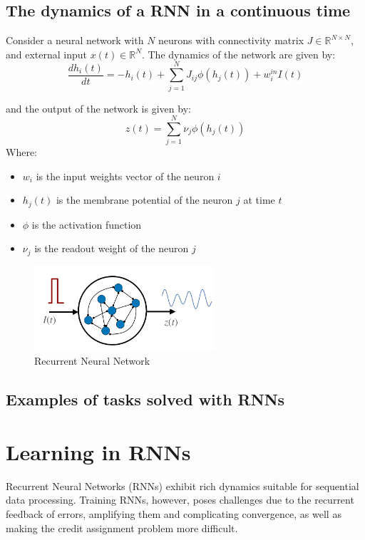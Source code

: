 \documentclass[11pt]{book} %
\begin{document}
\subsection{The dynamics of a RNN in a continuous time}
Consider a neural network with $N$ neurons with connectivity matrix $J \in \mathbb{R}^{N \times N}$, and external input $x(t) \in \mathbb{R}^N$.
The dynamics of the network are given by:
\[
    \frac{dh_i(t)}{dt} = -h_i(t) + \sum_{j=1}^N J_{ij} \phi(h_j(t)) + w_i^{in} I(t)
\]

and the output of the network is given by:
\[
    z(t) = \sum_{j=1}^N \nu_j \phi(h_j(t))
\]
Where:
\begin{itemize}
    \item $w_i$ is the input weights vector of the neuron $i$
    \item $h_j(t)$ is the membrane potential of the neuron $j$ at time $t$
    \item $\phi$ is the activation function
    \item $\nu_j$ is the readout weight of the neuron $j$
\end{itemize}

\begin{figure}
    \centering
    \includegraphics[width=0.6\textwidth]{Figs/RNN.jpeg}
    \caption{Recurrent Neural Network}
    \label{fig:rnn}
\end{figure}

\subsection{Examples of tasks solved with RNNs}

\section{Learning in RNNs}

Recurrent Neural Networks (RNNs) exhibit rich dynamics suitable for sequential data processing. 
Training RNNs, however, poses challenges due to the recurrent feedback of errors, amplifying them and complicating convergence, 
as well as making the credit assignment problem more difficult.
\end{document}
